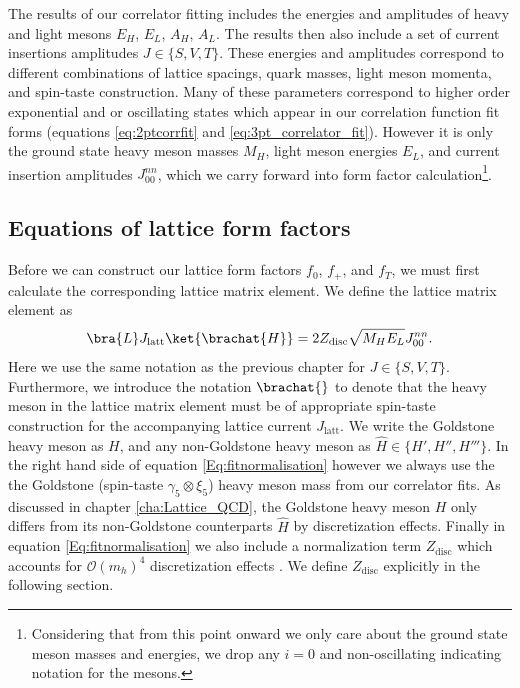 The results of our correlator fitting includes the energies and amplitudes of heavy and light mesons $E_H$, $E_L$, $A_H$, $A_L$. The results then also include a set of current insertions amplitudes $J\in\{S,V,T\}$.  These energies and amplitudes correspond to different combinations of lattice spacings, quark masses, light meson momenta, and spin-taste construction.  Many of these parameters correspond to higher order exponential and or oscillating states which appear in our correlation function fit forms (equations \ref{eq:2ptcorrfit} and \ref{eq:3pt_correlator_fit}). However it is only the ground state heavy meson masses $M_{H}$, light meson energies $E_L$, and current insertion amplitudes $J^{nn}_{00}$, which we carry forward into form factor calculation\footnote{Considering that from this point onward we only care about the ground state meson masses and energies, we drop any $i=0$ and non-oscillating indicating notation for the mesons.}.

\subsection{Equations of lattice form factors}\label{sec:equations_of_lattice_form_factors}
Before we can construct our lattice form factors $f_0$, $f_+$, and $f_T$, we must first calculate the corresponding lattice matrix element.  We define the lattice matrix element as 
\begin{equation}\label{Eq:fitnormalisation}
  \bra{L}J_{\mathrm{latt}}\ket{\brachat{H}}=2Z_{\mathrm{disc}}\sqrt{M_{H}E_{L}}J^{{nn}}_{00}.
\end{equation}
Here we use the same notation as the previous chapter for $J\in\{S,V,T\}$.  Furthermore, we introduce the notation $\brachat{}$ to denote that the heavy meson in the lattice matrix element must be of appropriate spin-taste construction for the accompanying lattice current $J_\mathrm{latt}$.  We write the Goldstone heavy meson as $H$, and any non-Goldstone heavy meson as $\hat{H} \in \{H',H'',H'''\}$.  In the right hand side of equation \ref{Eq:fitnormalisation} however we always use the the Goldstone (spin-taste $\gamma_5 \otimes\xi_5$) heavy meson mass from our correlator fits.  As discussed in chapter \ref{cha:Lattice_QCD}, the Goldstone heavy meson $H$ only differs from its non-Goldstone counterparts $\hat{H}$ by discretization effects.  Finally in equation \ref{Eq:fitnormalisation} we also include a normalization term $Z_\mathrm{disc}$ which accounts for $\mathcal{O}(m_h)^4$ discretization effects \cite{zdisc}. We define $Z_\mathrm{disc}$ explicitly in the following section.

